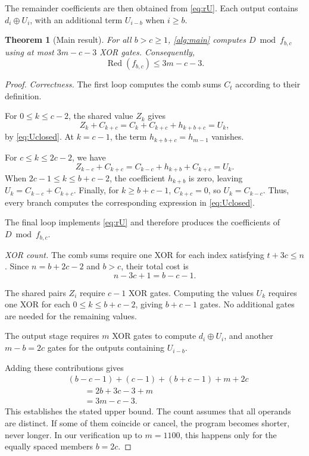 \documentclass{ieeeaccess}
\theoremstyle{plain}
\newtheorem{theorem}{Theorem}
\theoremstyle{definition}
\newcommand{\Red}{\operatorname{Red}}
\newcommand{\xor}{\oplus}
\begin{document}
The remainder coefficients are then obtained from \eqref{eq:rU}. Each output
contains $d_i\xor U_i$, with an additional term $U_{i-b}$ when $i\ge b$.

\begin{theorem}[Main result]\label{thm:main}
For all $b>c\ge1$, \cref{alg:main} computes $D\bmod f_{b,c}$ using at most
$3m-c-3$ XOR gates. Consequently,
\[
  \Red(f_{b,c})\le3m-c-3.
\]
\end{theorem}

\begin{proof}
\emph{Correctness.} The first loop computes the comb sums $C_t$ according to
their definition.

For $0\le k\le c-2$, the shared value $Z_k$ gives
\[
  Z_k+C_{k+c}
  =C_k+C_{k+c}+h_{k+b+c}=U_k,
\]
by \eqref{eq:Uclosed}. At $k=c-1$, the term $h_{k+b+c}=h_{m-1}$ vanishes.

For $c\le k\le2c-2$, we have
\[
  Z_{k-c}+C_{k+c}
  =C_{k-c}+h_{k+b}+C_{k+c}=U_k.
\]
When $2c-1\le k\le b+c-2$, the coefficient $h_{k+b}$ is zero, leaving
$U_k=C_{k-c}+C_{k+c}$. Finally, for $k\ge b+c-1$, $C_{k+c}=0$, so $U_k=C_{k-c}$.
Thus, every branch computes the corresponding expression in \eqref{eq:Uclosed}.

The final loop implements \eqref{eq:rU} and therefore produces the coefficients
of $D\bmod f_{b,c}$.

\emph{XOR count.} The comb sums require one XOR for each index satisfying
$t+3c\le n$. Since $n=b+2c-2$ and $b>c$, their total cost is
\[
  n-3c+1=b-c-1.
\]

The shared pairs $Z_i$ require $c-1$ XOR gates. Computing the values $U_k$
requires one XOR for each $0\le k\le b+c-2$, giving $b+c-1$ gates. No additional
gates are needed for the remaining values.

The output stage requires $m$ XOR gates to compute $d_i\xor U_i$, and another
$m-b=2c$ gates for the outputs containing $U_{i-b}$.

Adding these contributions gives
\begin{align*}
&(b-c-1)+(c-1)+(b+c-1)+m+2c\\
&\qquad=2b+3c-3+m\\
&\qquad=3m-c-3.
\end{align*}
This establishes the stated upper bound. The count assumes that all operands are
distinct. If some of them coincide or cancel, the program becomes shorter, never
longer. In our verification up to $m=1100$, this happens only for the equally
spaced members $b=2c$.
\end{proof}
\end{document}
